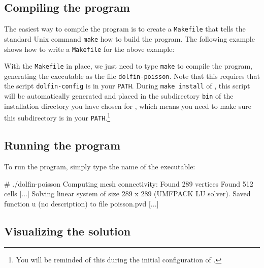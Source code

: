 \subsection{Compiling the program}

The easiest way to compile the program is to create a
\texttt{Makefile} that tells the standard Unix command \texttt{make}
how to build the program. The following example shows how to write a
\texttt{Makefile} for the above example:
\footnotesize
{}
\normalsize

With the \texttt{Makefile} in place, we just need to type
\texttt{make} to compile the program, generating the executable
as the file \texttt{dolfin-poisson}. Note that this requires that the
script \texttt{dolfin-config} is in your \texttt{PATH}. During
\texttt{make install} of \dolfin{}, this script will be
automatically generated and placed in the subdirectory \texttt{bin} of
the installation directory you have chosen for \dolfin{}, which
means you need to make sure this subdirectory is in your
\texttt{PATH}.\footnote{You will be reminded of this during the
  initial configuration of \dolfin{}.}

\subsection{Running the program}

To run the program, simply type the name of the executable:
\begin{code}
  # ./dolfin-poisson
  Computing mesh connectivity:
  Found 289 vertices
  Found 512 cells
  [...]
  Solving linear system of size 289 x 289 (UMFPACK LU solver).
  Saved function u (no description) to file poisson.pvd [...]
\end{code}

\subsection{Visualizing the solution}

